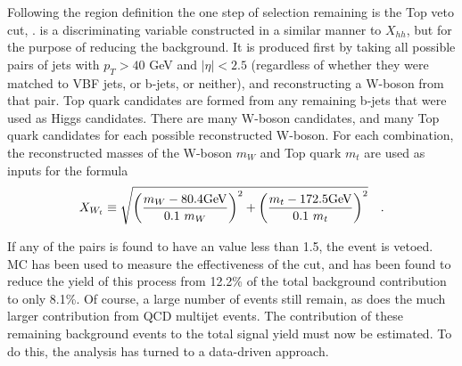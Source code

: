        \FloatBarrier
        Following the region definition the one step of selection remaining is the Top veto cut, \xwt.
        \xwt is a discriminating variable constructed in a similar manner to $X_{hh}$,
            but for the purpose of reducing the \ttbar background.
        It is produced first by taking all possible pairs of jets with $p_T > 40$ GeV and $|\eta| < 2.5$
            (regardless of whether they were matched to VBF jets, or b-jets, or neither),
            and reconstructing a W-boson from that pair.
        Top quark candidates are formed from any remaining b-jets that were used as Higgs candidates.
        There are many W-boson candidates, and many Top quark candidates for each possible reconstructed W-boson.
        For each combination, the reconstructed masses of the W-boson $m_W$ and Top quark $m_t$
            are used as inputs for the formula
        \begin{equation} \label{eq:xwt}
            \xwt \equiv \sqrt{\left(\frac{m_W - 80.4\textrm{GeV}}{0.1 \ m_W}\right)^{2}
                + \left(\frac{m_t - 172.5\textrm{GeV}}{0.1 \ m_t}\right)^{2}}
            \quad.
        \end{equation}

        If any of the pairs is found to have an \xwt value less than 1.5, the event is vetoed. 
        \ttbar MC has been used to measure the effectiveness of the \xwt cut,
            and has been found to reduce the yield of this process from
            12.2\% of the total background contribution to only 8.1\%.
        Of course, a large number of \ttbar events still remain,
            as does the much larger contribution from QCD multijet events.
        The contribution of these remaining background events to the total signal yield
            must now be estimated.
        To do this, the analysis has turned to a data-driven approach.

